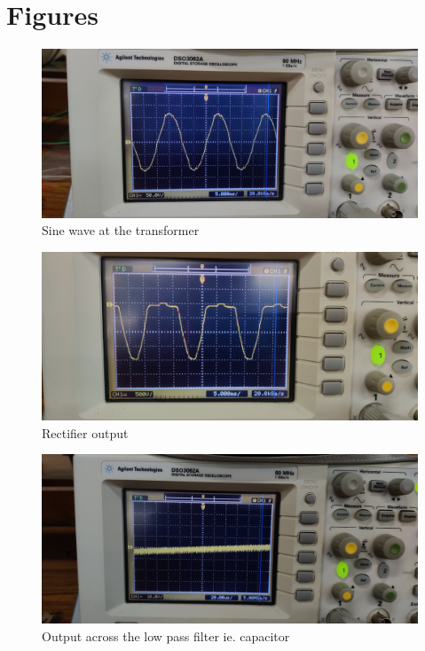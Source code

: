 \documentclass[journal,12pt,twocolumn]{IEEEtran}
\begin{document}
\section{Figures}
\begin{figure}[h!]
    \centering
    \includegraphics[width=\columnwidth]{figures/transform.jpg}
    \caption{Sine wave at the transformer}
    \label{fig:transform}
\end{figure}

\begin{figure}[h!]
    \centering
    \includegraphics[width=\columnwidth]{figures/rect.jpg}
    \caption{Rectifier output}
    \label{fig:rect}
\end{figure}

\begin{figure}
    \centering
    \includegraphics[width=\columnwidth]{figures/filter.jpg}
    \caption{Output across the low pass filter ie. capacitor}
    \label{fig:filter}
\end{figure}
\end{document}
